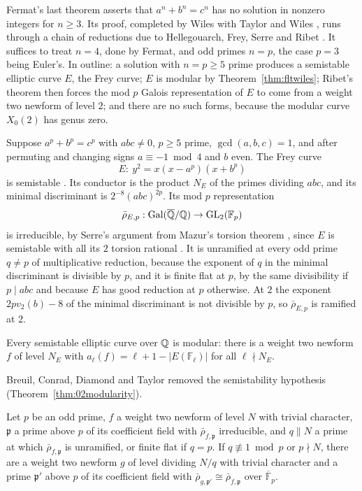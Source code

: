 Fermat's last theorem asserts that $a^n+b^n=c^n$ has no solution in nonzero integers for $n\ge3$. Its proof, completed by Wiles \cite{wiles1995} with Taylor and Wiles \cite{taylorwiles1995}, runs through a chain of reductions due to Hellegouarch, Frey, Serre and Ribet \cite{hellegouarch1975,frey1986,serre1987,ribet1990}. It suffices to treat $n=4$, done by Fermat, and odd primes $n=p$, the case $p=3$ being Euler's. In outline: a solution with $n=p\ge5$ prime produces a semistable elliptic curve $E$, the Frey curve; $E$ is modular by Theorem~\ref{thm:fltwiles}; Ribet's theorem then forces the mod $p$ Galois representation of $E$ to come from a weight two newform of level $2$; and there are no such forms, because the modular curve $X_0(2)$ has genus zero.

Suppose $a^p+b^p=c^p$ with $abc\ne0$, $p\ge5$ prime, $\gcd(a,b,c)=1$, and after permuting and changing signs $a\equiv-1\bmod4$ and $b$ even. The Frey curve
\[E:\ y^2=x(x-a^p)(x+b^p)\]
is semistable \cite{frey1986,serre1987}. Its conductor is the product $N_E$ of the primes dividing $abc$, and its minimal discriminant is $2^{-8}(abc)^{2p}$. Its mod $p$ representation\[\bar\rho_{E,p}:\operatorname{Gal}(\overline{\mathbb{Q}}/\mathbb{Q})\to\mathrm{GL}_2(\mathbb F_p)\]is irreducible, by Serre's argument \cite{serre1987} from Mazur's torsion theorem \cite{mazur1977}, since $E$ is semistable with all its $2$ torsion rational \cite[Theorem~2.9(c)]{ddt1995}. It is unramified at every odd prime $q\ne p$ of multiplicative reduction, because the exponent of $q$ in the minimal discriminant is divisible by $p$, and it is finite flat at $p$, by the same divisibility if $p\mid abc$ and because $E$ has good reduction at $p$ otherwise. At $2$ the exponent $2pv_2(b)-8$ of the minimal discriminant is not divisible by $p$, so $\bar\rho_{E,p}$ is ramified at $2$.

\begin{theorem}\label{thm:fltwiles}
Every semistable elliptic curve over $\mathbb{Q}$ is modular: there is a weight two newform $f$ of level $N_E$ with $a_\ell(f)=\ell+1-|E(\mathbb F_\ell)|$ for all $\ell\nmid N_E$.
\end{theorem}

Breuil, Conrad, Diamond and Taylor \cite{bcdt2001} removed the semistability hypothesis (Theorem~\ref{thm:02modularity}).

\begin{theorem}\label{thm:fltribet}
Let $p$ be an odd prime, $f$ a weight two newform of level $N$ with trivial character, $\mathfrak p$ a prime above $p$ of its coefficient field with $\bar\rho_{f,\mathfrak p}$ irreducible, and $q\| N$ a prime at which $\bar\rho_{f,\mathfrak p}$ is unramified, or finite flat if $q=p$. If $q\not\equiv1\bmod p$ or $p\nmid N$, there are a weight two newform $g$ of level dividing $N/q$ with trivial character and a prime $\mathfrak p'$ above $p$ of its coefficient field with $\bar\rho_{g,\mathfrak p'}\cong\bar\rho_{f,\mathfrak p}$ over $\overline{\mathbb F}_p$.
\end{theorem}


